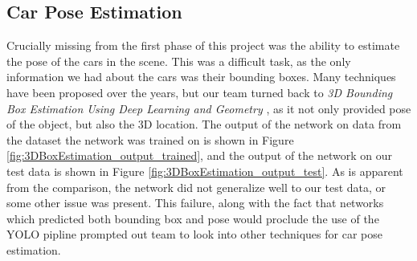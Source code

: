 \subsection{Car Pose Estimation}
Crucially missing from the first phase of this project was the ability to estimate the pose of the cars in the scene. This was a difficult task, as the only information we had about the cars was their bounding boxes. Many techniques have been proposed over the years, but our team turned back to \emph{3D Bounding Box Estimation Using Deep Learning and Geometry} \cite{3DBoxEstimation}, as it not only provided pose of the object, but also the 3D location. The output of the network on data from the dataset the network was trained on is shown in Figure \ref{fig:3DBoxEstimation_output_trained}, and the output of the network on our test data is shown in Figure \ref{fig:3DBoxEstimation_output_test}. As is apparent from the comparison, the network did not generalize well to our test data, or some other issue was present. This failure, along with the fact that networks which predicted both bounding box and pose would proclude the use of the YOLO pipline prompted out team to look into other techniques for car pose estimation.

